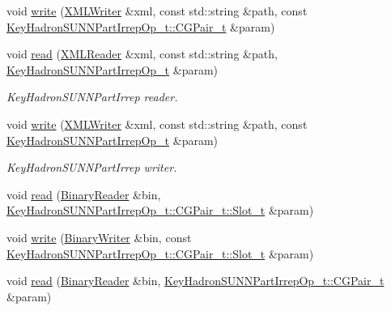 \begin{DoxyCompactItemize}
\item 
void \mbox{\hyperlink{namespaceHadron_a835e4515b6f5e491ce57ac5169196d90}{write}} (\mbox{\hyperlink{classADATXML_1_1XMLWriter}{X\+M\+L\+Writer}} \&xml, const std\+::string \&path, const \mbox{\hyperlink{structHadron_1_1KeyHadronSUNNPartIrrepOp__t_1_1CGPair__t}{Key\+Hadron\+S\+U\+N\+N\+Part\+Irrep\+Op\+\_\+t\+::\+C\+G\+Pair\+\_\+t}} \&param)
\item 
void \mbox{\hyperlink{namespaceHadron_a6ee3d9a9ffb4f6e626fa1a73b49c9ee0}{read}} (\mbox{\hyperlink{classADATXML_1_1XMLReader}{X\+M\+L\+Reader}} \&xml, const std\+::string \&path, \mbox{\hyperlink{structHadron_1_1KeyHadronSUNNPartIrrepOp__t}{Key\+Hadron\+S\+U\+N\+N\+Part\+Irrep\+Op\+\_\+t}} \&param)
\begin{DoxyCompactList}\small\item\em Key\+Hadron\+S\+U\+N\+N\+Part\+Irrep reader. \end{DoxyCompactList}\item 
void \mbox{\hyperlink{namespaceHadron_a04a5b512d84ea116e0714765e22cbc30}{write}} (\mbox{\hyperlink{classADATXML_1_1XMLWriter}{X\+M\+L\+Writer}} \&xml, const std\+::string \&path, const \mbox{\hyperlink{structHadron_1_1KeyHadronSUNNPartIrrepOp__t}{Key\+Hadron\+S\+U\+N\+N\+Part\+Irrep\+Op\+\_\+t}} \&param)
\begin{DoxyCompactList}\small\item\em Key\+Hadron\+S\+U\+N\+N\+Part\+Irrep writer. \end{DoxyCompactList}\item 
void \mbox{\hyperlink{namespaceHadron_a5927f6c6b145b1ae72a2bc9461e617ca}{read}} (\mbox{\hyperlink{classADATIO_1_1BinaryReader}{Binary\+Reader}} \&bin, \mbox{\hyperlink{structHadron_1_1KeyHadronSUNNPartIrrepOp__t_1_1CGPair__t_1_1Slot__t}{Key\+Hadron\+S\+U\+N\+N\+Part\+Irrep\+Op\+\_\+t\+::\+C\+G\+Pair\+\_\+t\+::\+Slot\+\_\+t}} \&param)
\item 
void \mbox{\hyperlink{namespaceHadron_ad5c8dc860360f98655b29f17b61f2a35}{write}} (\mbox{\hyperlink{classADATIO_1_1BinaryWriter}{Binary\+Writer}} \&bin, const \mbox{\hyperlink{structHadron_1_1KeyHadronSUNNPartIrrepOp__t_1_1CGPair__t_1_1Slot__t}{Key\+Hadron\+S\+U\+N\+N\+Part\+Irrep\+Op\+\_\+t\+::\+C\+G\+Pair\+\_\+t\+::\+Slot\+\_\+t}} \&param)
\item 
void \mbox{\hyperlink{namespaceHadron_ae56ab02908d10b1a8e5c2bad920dfe5a}{read}} (\mbox{\hyperlink{classADATIO_1_1BinaryReader}{Binary\+Reader}} \&bin, \mbox{\hyperlink{structHadron_1_1KeyHadronSUNNPartIrrepOp__t_1_1CGPair__t}{Key\+Hadron\+S\+U\+N\+N\+Part\+Irrep\+Op\+\_\+t\+::\+C\+G\+Pair\+\_\+t}} \&param)

\end{DoxyCompactItemize}
